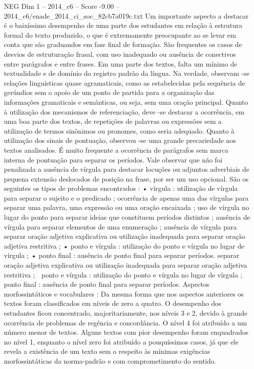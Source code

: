 \begin{textsample}{NEG Dim 1 – 2014\_c6 – Score -9.00 – 2014\_c6/enade\_2014\_ci\_soc\_82cb7a019c.txt}
Um importante aspecto a destacar é o baixíssimo desempenho de uma parte dos estudantes em relação à estrutura formal do texto produzido, o que é extremamente preocupante ao se levar em conta que são graduandos em fase final de formação.
São frequentes os casos de desvios de estruturação frasal, com uso inadequado ou ausência de conectivos entre parágrafos e entre frases.
Em uma parte dos textos, falta um mínimo de textualidade e de domínio do registro padrão da língua.
Na verdade, observam -se relações linguísticas quase agramaticais, como as estabelecidas pela sequência de gerúndios sem o apoio de um ponto de partida para a organização das informações gramaticais e semânticas, ou seja, sem uma oração principal.
Quanto à utilização dos mecanismos de referenciação, deve -se destacar a ocorrência, em uma boa parte dos textos, de repetições de palavras ou expressões sem a utilização de termos sinônimos ou pronomes, como seria adequado.
Quanto à utilização dos sinais de pontuação, observou -se uma grande precariedade nos textos analisados.
É muito frequente a ocorrência de parágrafos sem marca interna de pontuação para separar os períodos.
Vale observar que não foi penalizada a ausência de vírgula para destacar locuções ou adjuntos adverbiais de pequena extensão deslocados de posição na frase, por ser um uso opcional.
São os seguintes os tipos de problemas encontrados : • vírgula : utilização de vírgula para separar o sujeito e o predicado ; ocorrência de apenas uma das vírgulas para separar uma palavra, uma expressão ou uma oração encaixada ; uso de vírgula no lugar do ponto para separar ideias que constituem períodos distintos ; ausência de vírgula para separar elementos de uma enumeração ; ausência de vírgula para separar oração adjetiva explicativa ou utilização inadequada para separar oração adjetiva restritiva ; • ponto e vírgula : utilização do ponto e vírgula no lugar de vírgula ; • ponto final : ausência de ponto final para separar períodos. separar oração adjetiva explicativa ou utilização inadequada para separar oração adjetiva restritiva ;  ponto e vírgula : utilização do ponto e vírgula no lugar de vírgula ;  ponto final : ausência de ponto final para separar períodos.
Aspectos morfossintáticos e vocabulares : Da mesma forma que nos aspectos anteriores os textos foram classificados em níveis de zero a quatro.
O desempenho dos estudantes ficou concentrado, majoritariamente, nos níveis 3 e 2, devido à grande ocorrência de problemas de regência e concordância.
O nível 4 foi atribuído a um número menor de textos.
Alguns textos com pior desempenho foram enquadrados no nível 1, enquanto o nível zero foi atribuído a pouquíssimos casos, já que ele revela a existência de um texto sem o respeito às mínimas exigências morfossintáticas da norma-padrão e com comprometimento do sentido.

\end{textsample}
